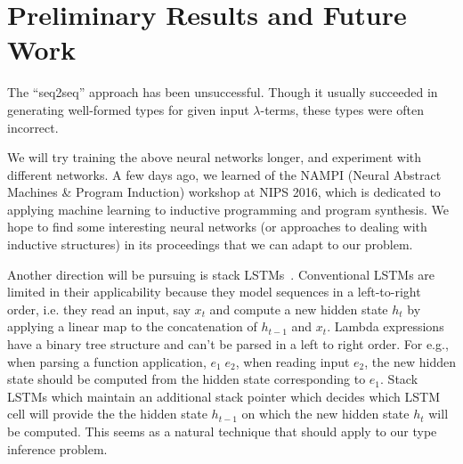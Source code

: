 \documentclass{amsart}
\begin{document}
\section{Preliminary Results and Future Work}

The ``seq2seq'' approach has been unsuccessful. Though it usually
succeeded in generating well-formed types for given input
$\lambda$-terms, these types were often incorrect.

We will try training the above neural networks longer, and experiment
with different networks.
A few days ago, we learned of the NAMPI (Neural Abstract Machines \&
Program Induction) workshop at NIPS 2016, which is dedicated to
applying machine learning to inductive programming and program
synthesis. We hope to find some interesting neural networks (or
approaches to dealing with inductive structures) in its proceedings
that we can adapt to our problem.

Another direction will be pursuing is stack LSTMs~\cite{DyerBLMS15}.
Conventional LSTMs are limited in their applicability because
they model sequences in a left-to-right order, i.e. they read an input,
say $x_t$ and compute a new hidden state $h_t$ by applying a linear map
to the concatenation of $h_{t-1}$ and $x_t$. Lambda expressions
have a binary tree structure and can't be parsed in a left to right order.
For e.g., when parsing a function application, $e_1 \; e_2$, when
reading input $e_2$, the new hidden state should be computed from
the hidden state corresponding to $e_1$. Stack LSTMs
which maintain an additional stack pointer which decides which
LSTM cell will provide the the hidden state $h_{t-1}$ on which
the new hidden state $h_t$ will be computed. This seems
as a natural technique that should apply to our type inference
problem.



\end{document}
